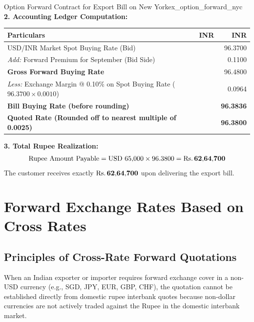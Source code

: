 \begin{example}{Option Forward Contract for Export Bill on New York}{ex_option_forward_nyc}
\noindent\textbf{2. Accounting Ledger Computation:}
\begin{center}
\begin{tabularx}{0.96\linewidth}{Xrr}
    \toprule
    \textbf{Particulars} & \textbf{INR} & \textbf{INR} \\
    \midrule
    USD/INR Market Spot Buying Rate (Bid) & & 96.3700 \\
    \textit{Add:} Forward Premium for September (Bid Side) & & 0.1100 \\
    \midrule
    \textbf{Gross Forward Buying Rate} & & 96.4800 \\
    \textit{Less:} Exchange Margin @ 0.10\% on Spot Buying Rate ($96.3700 \times 0.0010$) & & 0.0964 \\
    \midrule
    \textbf{Bill Buying Rate (before rounding)} & & \textbf{96.3836} \\
    \textbf{Quoted Rate (Rounded off to nearest multiple of 0.0025)} & & \textbf{96.3800} \\
    \bottomrule
\end{tabularx}
\end{center}

\noindent\textbf{3. Total Rupee Realization:}
\begin{equation}
    \text{Rupee Amount Payable} = \text{USD } 65{,}000 \times 96.3800 = \mathbf{\text{Rs.}\, 62{,}64{,}700}
\end{equation}
The customer receives exactly $\mathbf{\text{Rs.}\, 62{,}64{,}700}$ upon delivering the export bill.
\end{example}

\section{Forward Exchange Rates Based on Cross Rates}

\subsection{Principles of Cross-Rate Forward Quotations}
When an Indian exporter or importer requires forward exchange cover in a non-USD currency (e.g., SGD, JPY, EUR, GBP, CHF), the quotation cannot be established directly from domestic rupee interbank quotes because non-dollar currencies are not actively traded against the Rupee in the domestic interbank market.

